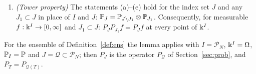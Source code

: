 \begin{lemma}
\begin{enumerate}[label=\textup{(\alph*)},leftmargin=2.2em,itemsep=1pt]
For every fixed $x'\in\kk^{J^c}$, the coordinate functions $y\mapsto y_\iota$, $\iota\in J$, on the probability space $(\kk^J,\PP_J)$ are independent with laws $\nu_\iota$, and $(P_Jf)(x',\cdot)$ is the expectation of the random variable $y\mapsto f(x',y)$ on this space.
\item \emph{(Tower property)} The statements \textup{(a)--(e)} hold for the index set $J$ and any $J_1\subset J$ in place of $I$ and $J$: $\mathbb{P}_J=\mathbb{P}_{J\setminus J_1}\otimes\mathbb{P}_{J_1}$. Consequently, for measurable $f:\Bbbk^I\to[0,\infty]$ and $J_1\subset J$:
$P_JP_{J_1}f=P_Jf$ at every point of $\Bbbk^I$.
\end{enumerate}
For the ensemble of Definition~\ref{def:ens} the lemma applies with $I=\mathcal P_N$, $\Bbbk^I=\Omega$, $\mathbb{P}_I=\mathbb{P}$ and $J=\mathcal Q\subset\mathcal P_N$; then $P_J$ is the operator $P_{\mathcal Q}$ of Section~\ref{sec:prob}, and $P_T=P_{\mathcal Q(T)}$.
\end{lemma}
